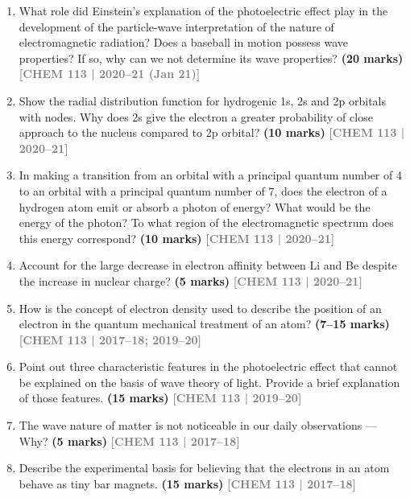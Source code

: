 \documentclass[12pt,a3paper]{article}
\newcommand{\yr}[1]{\hfill\textcolor{gray}{\small\textbf{[#1]}}}
\newcommand{\mk}[1]{\textcolor{orange!70!black}{\small\textbf{(#1 marks)}}}
\begin{document}
\begin{enumerate}
\item What role did Einstein's explanation of the photoelectric effect play in the development of the particle-wave interpretation of the nature of electromagnetic radiation? Does a baseball in motion possess wave properties? If so, why can we not determine its wave properties? \mk{20}
\yr{CHEM 113 | 2020--21 (Jan 21)}



\item Show the radial distribution function for hydrogenic 1s, 2s and 2p orbitals with nodes. Why does 2s give the electron a greater probability of close approach to the nucleus compared to 2p orbital? \mk{10}
\yr{CHEM 113 | 2020--21}



\item In making a transition from an orbital with a principal quantum number of 4 to an orbital with a principal quantum number of 7, does the electron of a hydrogen atom emit or absorb a photon of energy? What would be the energy of the photon? To what region of the electromagnetic spectrum does this energy correspond? \mk{10}
\yr{CHEM 113 | 2020--21}



\item Account for the large decrease in electron affinity between Li and Be despite the increase in nuclear charge? \mk{5}
\yr{CHEM 113 | 2020--21}



\item How is the concept of electron density used to describe the position of an electron in the quantum mechanical treatment of an atom? \mk{7--15}
\yr{CHEM 113 | 2017--18; 2019--20}



\item Point out three characteristic features in the photoelectric effect that cannot be explained on the basis of wave theory of light. Provide a brief explanation of those features. \mk{15}
\yr{CHEM 113 | 2019--20}



\item The wave nature of matter is not noticeable in our daily observations --- Why? \mk{5}
\yr{CHEM 113 | 2017--18}



\item Describe the experimental basis for believing that the electrons in an atom behave as tiny bar magnets. \mk{15}
\yr{CHEM 113 | 2017--18}




\end{enumerate}
\end{document}
